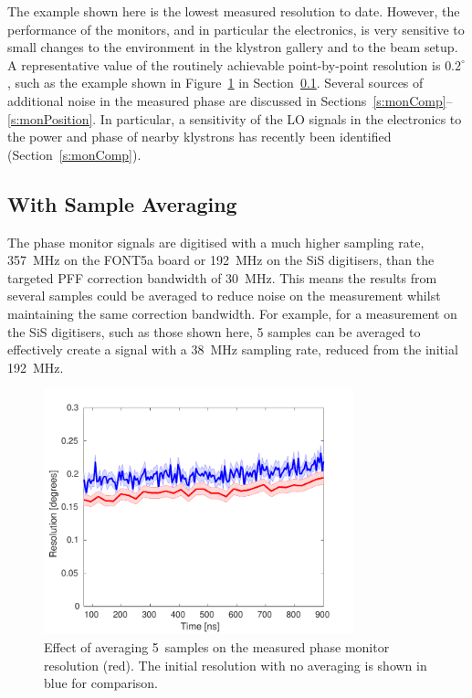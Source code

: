 The example shown here is the lowest measured resolution to date. However, the performance of the monitors, and in particular the electronics, is very sensitive to small changes to the environment in the klystron gallery and to the beam setup. A representative value of the routinely achievable point-by-point resolution is \(0.2^\circ\), such as the example shown in Figure~\ref{f:resolutionWithAveraging} in Section~\ref{ss:resSampAvg}. Several sources of additional noise in the measured phase are discussed in Sections~\ref{s:monComp}--\ref{s:monPosition}. In particular, a sensitivity of the LO signals in the electronics to the power and phase of nearby klystrons has recently been identified (Section~\ref{s:monComp}).



\subsection{With Sample Averaging}
\label{ss:resSampAvg}

The phase monitor signals are digitised with a much higher sampling rate, 357~MHz on the FONT5a board or 192~MHz on the SiS digitisers, than the targeted PFF correction bandwidth of 30~MHz. This means the results from several samples could be averaged to reduce noise on the measurement whilst maintaining the same correction bandwidth. For example, for a measurement on the SiS digitisers, such as those shown here, 5 samples can be averaged to effectively create a signal with a 38~MHz sampling rate, reduced from the initial 192~MHz. 

\begin{figure}
  \centering
  \includegraphics[width=0.8\textwidth]{Figures/phaseMons/resolutionWithAveraging}
  \caption{Effect of averaging 5~samples on the measured phase monitor resolution (red). The initial resolution with no averaging is shown in blue for comparison.}
  \label{f:resolutionWithAveraging}
\end{figure}

